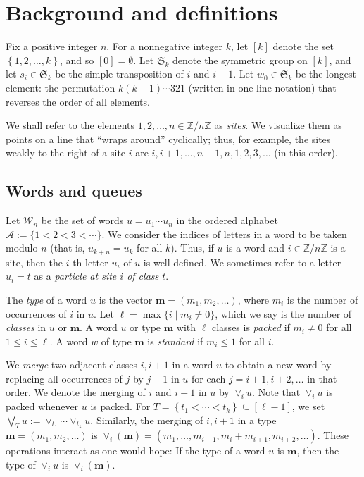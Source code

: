 \documentclass[reqno]{amsart}
\newcommand{\0}{\phantom{c}}
\newcommand{\merge}[1]{\vee_{#1}} %
\newcommand{\SymGp}[1]{\mathfrak{S}_{#1}} %
\newcommand{\mm}{\mathbf{m}}
\newcommand{\mcA}{\mathcal{A}}
\newcommand{\mcW}{\mathcal{W}}
\newcommand{\ZZ}{\mathbb{Z}}
\newcommand{\set}[1]{\left\{ #1 \right\}}
\newcommand{\ive}[1]{\left[ #1 \right]}
\newcommand{\defn}[1]{{\color{darkred}\emph{#1}}} %
\theoremstyle{plain}
\theoremstyle{definition}
\numberwithin{equation}{section}
\begin{document}
\section{Background and definitions}
\label{sec:background}

Fix a positive integer $n$.
For a nonnegative integer $k$, let $\ive{k}$ denote the set $\set{1, 2, \ldots, k}$, and so $[0] = \emptyset$.
Let $\SymGp{k}$ denote the symmetric group on $\ive{k}$, and let $s_i \in \SymGp{k}$ be the simple transposition of $i$ and $i+1$.
Let $w_0 \in \SymGp{k}$ be the longest element: the permutation $k (k-1) \dotsm 321$ (written in one line notation) that reverses the order of all elements.

We shall refer to the elements $1, 2, \ldots, n \in \ZZ / n \ZZ$ as \defn{sites}.
We visualize them as points on a line that ``wraps around'' cyclically; thus, for example, the sites weakly to the right of a site $i$ are $i, i+1, \ldots, n-1, n, 1, 2, 3, \ldots$ (in this order).

\subsection{Words and queues}

Let $\mcW_n$ be the set of words $u = u_1 \dotsm u_n$ in the ordered alphabet $\mcA := \{1 < 2 < 3 < \cdots \}$.
We consider the indices of letters in a word to be taken modulo $n$ (that is, $u_{k+n} = u_k$ for all $k$).
Thus, if $u$ is a word and $i \in \ZZ / n \ZZ$ is a site, then the $i$-th letter $u_i$ of $u$ is well-defined.
We sometimes refer to a letter $u_i = t$ as a \defn{particle at site $i$ of class $t$}.

The \defn{type} of a word $u$ is the vector $\mm = (m_1, m_2, \ldots)$, where $m_i$ is the number of occurrences of $i$ in $u$.
Let $\ell = \max\{i \mid m_i \neq 0 \}$, which we say is the number of \defn{classes} in $u$ or $\mm$.
A word $u$ or type $\mm$ with $\ell$ classes is \defn{packed} if $m_i \neq 0$ for all $1 \leq i \leq \ell$.
A word $w$ of type $\mm$ is \defn{standard} if $m_i \leq 1$ for all $i$.

We \defn{merge} two adjacent classes $i,i+1$ in a word $u$ to obtain a new word by replacing all occurrences of $j$ by $j-1$ in $u$ for each $j = i+1, i+2, \ldots$ in that order.
We denote the merging of $i$ and $i+1$ in $u$ by $\merge{i} u$.
Note that $\merge{i} u$ is packed whenever $u$ is packed.
For $T = \set{t_1 < \cdots < t_k} \subseteq \ive{\ell-1}$, we set $\bigvee_T u := \merge{t_1} \cdots \merge{t_k} u$.
Similarly, the merging of $i,i+1$ in a type $\mm = (m_1, m_2, \ldots)$ is $\merge{i}(\mm) = (m_1, \dotsc, m_{i-1}, m_i + m_{i+1}, m_{i+2}, \ldots)$.
These operations interact as one would hope:
If the type of a word $u$ is $\mm$, then the type of $\merge{i} u$ is $\merge{i}(\mm)$.
\end{document}
